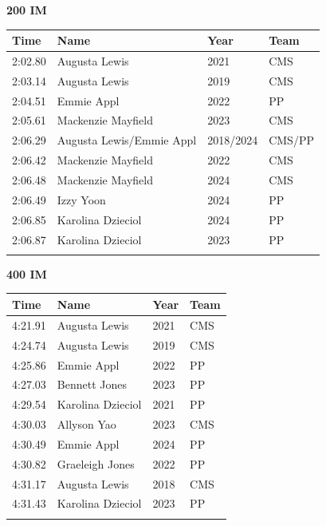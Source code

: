 \vspace{1.2em}
\noindent\begin{minipage}[t]{0.98\textwidth}
\centering
\textbf{\textcolor{teamprimary}{200 IM}}\par
\vspace{0.5em}
\centering
\small
\renewcommand{\arraystretch}{1.0}
\setlength{\tabcolsep}{4pt}
\begin{tabular}{@{}p{2.5cm}p{4.5cm}p{1.5cm}p{2.5cm}@{}}
\toprule
\textbf{Time} & \textbf{Name} & \textbf{Year} & \textbf{Team} \\
\midrule
2:02.80 & Augusta Lewis & 2021 & CMS \\
2:03.14 & Augusta Lewis & 2019 & CMS \\
2:04.51 & Emmie Appl & 2022 & PP \\
2:05.61 & Mackenzie Mayfield & 2023 & CMS \\
2:06.29 & Augusta Lewis/Emmie Appl & 2018/2024 & CMS/PP \\
2:06.42 & Mackenzie Mayfield & 2022 & CMS \\
2:06.48 & Mackenzie Mayfield & 2024 & CMS \\
2:06.49 & Izzy Yoon & 2024 & PP \\
2:06.85 & Karolina Dzieciol & 2024 & PP \\
2:06.87 & Karolina Dzieciol & 2023 & PP \\
\bottomrule
\vspace{0.5em}
\end{tabular}
\end{minipage}
\vspace{1.2em}
\noindent\begin{minipage}[t]{0.98\textwidth}
\centering
\textbf{\textcolor{teamprimary}{400 IM}}\par
\vspace{0.5em}
\centering
\small
\renewcommand{\arraystretch}{1.0}
\setlength{\tabcolsep}{4pt}
\begin{tabular}{@{}p{2.5cm}p{4.5cm}p{1.5cm}p{2.5cm}@{}}
\toprule
\textbf{Time} & \textbf{Name} & \textbf{Year} & \textbf{Team} \\
\midrule
4:21.91 & Augusta Lewis & 2021 & CMS \\
4:24.74 & Augusta Lewis & 2019 & CMS \\
4:25.86 & Emmie Appl & 2022 & PP \\
4:27.03 & Bennett Jones & 2023 & PP \\
4:29.54 & Karolina Dzieciol & 2021 & PP \\
4:30.03 & Allyson Yao & 2023 & CMS \\
4:30.49 & Emmie Appl & 2024 & PP \\
4:30.82 & Graeleigh Jones & 2022 & PP \\
4:31.17 & Augusta Lewis & 2018 & CMS \\
4:31.43 & Karolina Dzieciol & 2023 & PP \\
\bottomrule
\vspace{0.5em}
\end{tabular}
\end{minipage}
